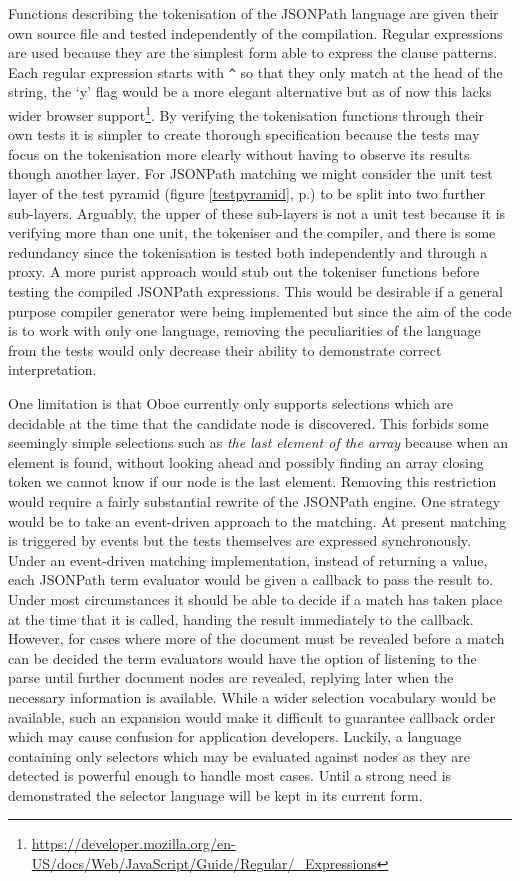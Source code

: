 \documentclass[12pt, ]{article}
\begin{document}
Functions describing the tokenisation of the JSONPath language are given
their own source file and tested independently of the compilation.
Regular expressions are used because they are the simplest form able to
express the clause patterns. Each regular expression starts with
\texttt{\^{}} so that they only match at the head of the string, the `y'
flag would be a more elegant alternative but as of now this lacks wider
browser support\footnote{\url{https://developer.mozilla.org/en-US/docs/Web/JavaScript/Guide/Regular/_Expressions}}.
By verifying the tokenisation functions through their own tests it is
simpler to create thorough specification because the tests may focus on
the tokenisation more clearly without having to observe its results
though another layer. For JSONPath matching we might consider the unit
test layer of the test pyramid (figure \ref{testpyramid},
p.\pageref{testpyramid}) to be split into two further sub-layers.
Arguably, the upper of these sub-layers is not a unit test because it is
verifying more than one unit, the tokeniser and the compiler, and there
is some redundancy since the tokenisation is tested both independently
and through a proxy. A more purist approach would stub out the tokeniser
functions before testing the compiled JSONPath expressions. This would
be desirable if a general purpose compiler generator were being
implemented but since the aim of the code is to work with only one
language, removing the peculiarities of the language from the tests
would only decrease their ability to demonstrate correct interpretation.

One limitation is that Oboe currently only supports selections which are
decidable at the time that the candidate node is discovered. This
forbids some seemingly simple selections such as \emph{the last element
of the array} because when an element is found, without looking ahead
and possibly finding an array closing token we cannot know if our node
is the last element. Removing this restriction would require a fairly
substantial rewrite of the JSONPath engine. One strategy would be to
take an event-driven approach to the matching. At present matching is
triggered by events but the tests themselves are expressed
synchronously. Under an event-driven matching implementation, instead of
returning a value, each JSONPath term evaluator would be given a
callback to pass the result to. Under most circumstances it should be
able to decide if a match has taken place at the time that it is called,
handing the result immediately to the callback. However, for cases where
more of the document must be revealed before a match can be decided the
term evaluators would have the option of listening to the parse until
further document nodes are revealed, replying later when the necessary
information is available. While a wider selection vocabulary would be
available, such an expansion would make it difficult to guarantee
callback order which may cause confusion for application developers.
Luckily, a language containing only selectors which may be evaluated
against nodes as they are detected is powerful enough to handle most
cases. Until a strong need is demonstrated the selector language will be
kept in its current form.
\end{document}
